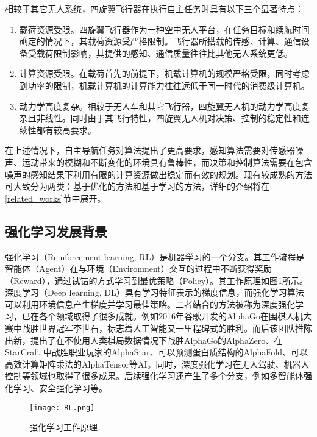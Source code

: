 相较于其它无人系统，四旋翼飞行器在执行自主任务时具有以下三个显著特点：
\begin{enumerate}
  \item 载荷资源受限。四旋翼飞行器作为一种空中无人平台，在任务目标和续航时间确定的情况下，其载荷资源受严格限制。飞行器所搭载的传感、计算、通信设备受载荷限制影响，其提供的感知、通信质量往往比其他无人系统更低。
  \item 计算资源受限。在载荷首先的前提下，机载计算机的规模严格受限，同时考虑到功率的限制，机载计算机的计算能力往往远低于同一时代的消费级计算机。
  \item 动力学高度复杂。相较于无人车和其它飞行器，四旋翼无人机的动力学高度复杂且非线性。同时由于其飞行特性，四旋翼无人机对决策、控制的稳定性和连续性都有较高要求。
\end{enumerate}
在上述情况下，自主导航任务对算法提出了更高要求，感知算法需要对传感器噪声、运动带来的模糊和不断变化的环境具有鲁棒性，而决策和控制算法需要在包含噪声的感知结果下利用有限的计算资源做出稳定而有效的规划。现有较成熟的方法可大致分为两类：基于优化的方法和基于学习的方法，详细的介绍将在\ref{related_works}节中展开。

\subsection{强化学习发展背景}
强化学习（Reinforcement learning, RL）是机器学习的一个分支。其工作流程是智能体（Agent）在与环境（Environment）交互的过程中不断获得奖励（Reward），通过试错的方式学习到最优策略（Policy）。其工作原理如图\ref{fig_RL}所示。深度学习（Deep learning, DL）具有学习特征表示的梯度信息，而强化学习算法可以利用环境信息产生梯度并学习最佳策略。二者结合的方法被称为深度强化学习，已在各个领域取得了很多成就。例如2016年谷歌开发的AlphaGo\cite{silver2016mastering}在围棋人机大赛中战胜世界冠军李世石，标志着人工智能又一里程碑式的胜利。而后该团队推陈出新，提出了在不使用人类棋局数据情况下战胜AlphaGo的AlphaZero\cite{silver2017mastering}、在StarCraft \uppercase\expandafter{}中战胜职业玩家的AlphaStar\cite{vinyals2019grandmaster}、可以预测蛋白质结构的AlphaFold\cite{senior2020improved}、可以高效计算矩阵乘法的AlphaTensor\cite{fawzi2022discovering}等AI。同时，深度强化学习在无人驾驶、机器人控制等领域也取得了很多成果\cite{chiang2019learning}\cite{liu2022safe}。后续强化学习还产生了多个分支，例如多智能体强化学习、安全强化学习等。
\begin{figure}
  \centering
  \texttt{[image: RL.png]}
  \caption{强化学习工作原理}
  \label{fig_RL}
\end{figure}

